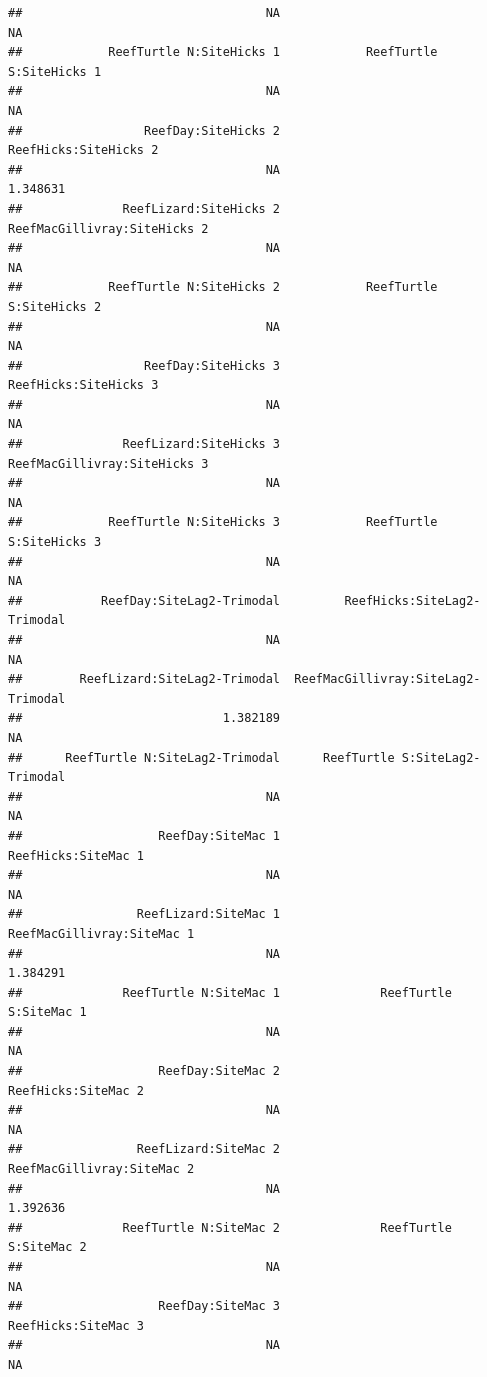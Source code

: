 \documentclass[
]{article}
\begin{document}
\begin{verbatim}
##                                  NA                                  NA 
##            ReefTurtle N:SiteHicks 1            ReefTurtle S:SiteHicks 1 
##                                  NA                                  NA 
##                 ReefDay:SiteHicks 2               ReefHicks:SiteHicks 2 
##                                  NA                            1.348631 
##              ReefLizard:SiteHicks 2        ReefMacGillivray:SiteHicks 2 
##                                  NA                                  NA 
##            ReefTurtle N:SiteHicks 2            ReefTurtle S:SiteHicks 2 
##                                  NA                                  NA 
##                 ReefDay:SiteHicks 3               ReefHicks:SiteHicks 3 
##                                  NA                                  NA 
##              ReefLizard:SiteHicks 3        ReefMacGillivray:SiteHicks 3 
##                                  NA                                  NA 
##            ReefTurtle N:SiteHicks 3            ReefTurtle S:SiteHicks 3 
##                                  NA                                  NA 
##           ReefDay:SiteLag2-Trimodal         ReefHicks:SiteLag2-Trimodal 
##                                  NA                                  NA 
##        ReefLizard:SiteLag2-Trimodal  ReefMacGillivray:SiteLag2-Trimodal 
##                            1.382189                                  NA 
##      ReefTurtle N:SiteLag2-Trimodal      ReefTurtle S:SiteLag2-Trimodal 
##                                  NA                                  NA 
##                   ReefDay:SiteMac 1                 ReefHicks:SiteMac 1 
##                                  NA                                  NA 
##                ReefLizard:SiteMac 1          ReefMacGillivray:SiteMac 1 
##                                  NA                            1.384291 
##              ReefTurtle N:SiteMac 1              ReefTurtle S:SiteMac 1 
##                                  NA                                  NA 
##                   ReefDay:SiteMac 2                 ReefHicks:SiteMac 2 
##                                  NA                                  NA 
##                ReefLizard:SiteMac 2          ReefMacGillivray:SiteMac 2 
##                                  NA                            1.392636 
##              ReefTurtle N:SiteMac 2              ReefTurtle S:SiteMac 2 
##                                  NA                                  NA 
##                   ReefDay:SiteMac 3                 ReefHicks:SiteMac 3 
##                                  NA                                  NA 

\end{verbatim}
\end{document}
